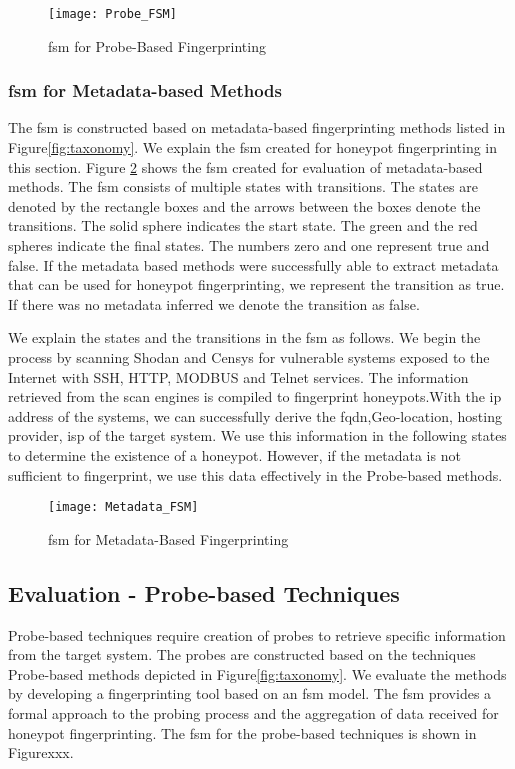 \begin{figure}[]
    \centering
    \texttt{[image: Probe\_FSM]}
    \caption{\acrshort{fsm} for Probe-Based Fingerprinting}
    \label{fig:probe_fsm}
\end{figure}



\subsubsection{\acrshort{fsm} for Metadata-based Methods}
\label{sec:metadata_fsm}
The \acrshort{fsm} is constructed based on metadata-based fingerprinting methods listed in Figure\ref{fig:taxonomy}. We explain the \acrshort{fsm} created for honeypot fingerprinting in this section. Figure \ref{fig:fsm_md} shows the \acrshort{fsm} created for evaluation of metadata-based methods. The \acrshort{fsm} consists of multiple states with transitions. The states are denoted by the rectangle boxes and the arrows between the boxes denote the transitions. The solid sphere indicates the start state. The green and the red spheres indicate the final states. The numbers zero and one represent true and false. If the metadata based methods were successfully able to extract metadata that can be used for honeypot fingerprinting, we represent the transition as true. If there was no metadata inferred we denote the transition as false. 

We explain the states and the transitions in the \acrshort{fsm} as follows. We begin the process by scanning Shodan and Censys for vulnerable systems exposed to the Internet with SSH, HTTP, MODBUS and Telnet services. The information retrieved from the scan engines is compiled to fingerprint honeypots.With the \acrshort{ip} address of the systems, we can successfully derive the \acrshort{fqdn},Geo-location, hosting provider, \acrshort{isp} of the target system. We use this information in the following states to determine the existence of a honeypot. However, if the metadata is not sufficient to fingerprint, we use this data effectively in the Probe-based methods. 

\begin{figure}[]
    \centering
    \texttt{[image: Metadata\_FSM]}
    \caption{\acrshort{fsm} for Metadata-Based Fingerprinting }
    \label{fig:fsm_md}
\end{figure}


\subsection{Evaluation - Probe-based Techniques}
Probe-based techniques require creation of probes to retrieve specific information from the target system. The probes are constructed based on the techniques Probe-based methods depicted in Figure\ref{fig:taxonomy}. We evaluate the methods by developing a fingerprinting tool based on an \acrfull{fsm} model. The \acrshort{fsm} provides a formal approach to the probing process and the aggregation of data received for honeypot fingerprinting. The \acrshort{fsm} for the probe-based techniques is shown in Figurexxx. 


